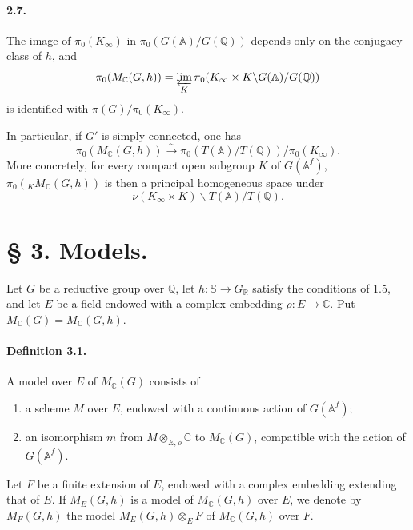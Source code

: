 \documentclass[10pt]{article}
\newcommand{\A}{\mathbb A}
\newcommand{\Af}{\mathbb A^f}
\newcommand{\C}{\mathbb C}
\newcommand{\Q}{\mathbb Q}
\newcommand{\R}{\mathbb R}
\newcommand{\bS}{\mathbb S}
\newcommand{\limproj}{\varprojlim}
\newcommand{\MC}{M_{\C}}
\begin{document}
\paragraph{2.7.} The image of $\pi_0(K_\infty)$ in $\pi_0(G(\A)/G(\Q))$ depends only on the conjugacy class of $h$, and
\[
\pi_0(\MC(G,h))=\limproj_K\pi_0(K_\infty\times K\backslash G(\A)/G(\Q))
\]
is identified with $\pi(G)/\pi_0(K_\infty)$.

In particular, if $G'$ is simply connected, one has
\[
\pi_0(\MC(G,h))\xrightarrow{\sim}\pi_0(T(\A)/T(\Q))/\pi_0(K_\infty). \tag{2.7.1}
\]
More concretely, for every compact open subgroup $K$ of $G(\Af)$, $\pi_0({}_K\MC(G,h))$ is then a principal homogeneous space under
\[
\nu(K_\infty\times K)\backslash T(\A)/T(\Q).
\]

\section*{§ 3. Models.}

Let $G$ be a reductive group over $\Q$, let $h:\bS\to G_\R$ satisfy the conditions of 1.5, and let $E$ be a field endowed with a complex embedding $\rho:E\to\C$. Put $\MC(G)=\MC(G,h)$.

\paragraph{Definition 3.1.} A model over $E$ of $\MC(G)$ consists of
\begin{enumerate}[label=(\alph*),leftmargin=2.4em]
\item a scheme $M$ over $E$, endowed with a continuous action of $G(\Af)$;
\item an isomorphism $m$ from $M\otimes_{E,\rho}\C$ to $\MC(G)$, compatible with the action of $G(\Af)$.
\end{enumerate}
Let $F$ be a finite extension of $E$, endowed with a complex embedding extending that of $E$. If $M_E(G,h)$ is a model of $\MC(G,h)$ over $E$, we denote by $M_F(G,h)$ the model $M_E(G,h)\otimes_E F$ of $\MC(G,h)$ over $F$.
\end{document}
